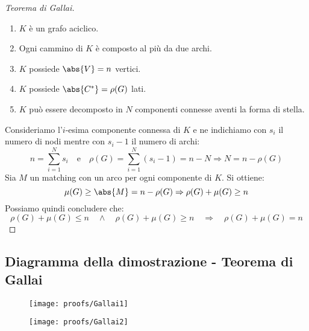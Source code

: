\documentclass[\main/main.tex]{subfiles}
\begin{document}
\begin{proof}[Teorema di Gallai]
	\begin{enumerate}
		\item \(K\) è un grafo aciclico.
		\item Ogni cammino di \(K\) è composto al più da due archi.
		\item \(K\) possiede \(\abs{V} = n\) vertici.
		\item \(K\) possiede \(\abs{C^*} = \rho(G)\) lati.
		\item \(K\) può essere decomposto in \(N\) componenti connesse aventi la forma di stella.
	\end{enumerate}

	Consideriamo l'\(i\)-esima componente connessa di \(K\) e ne indichiamo con \(s_i\) il numero di nodi mentre con \(s_i-1\) il numero di archi:
	\[
		n = \sum_{i=1}^N s_i \quad \text{e} \quad \rho(G) = \sum_{i=1}^N (s_i -1) = n - N \Rightarrow N = n - \rho(G)
	\]
	Sia \(M\) un matching con un arco per ogni componente di \(K\). Si ottiene:
	\[
		\mu(G) \geq \abs{M} = n - \rho(G) \Rightarrow \rho(G) + \mu(G) \geq n
	\]
	Possiamo quindi concludere che:
	\[
		\rho(G) + \mu(G) \leq n \quad \land \quad \rho(G) + \mu(G) \geq n\quad \Rightarrow \quad\rho(G) + \mu(G) = n
	\]

\end{proof}
\clearpage
\subsection{Diagramma della dimostrazione - Teorema di Gallai}
\begin{figure}
	\texttt{[image: proofs/Gallai1]}
\end{figure}
\clearpage
\begin{figure}
	\texttt{[image: proofs/Gallai2]}
\end{figure}
\clearpage
\end{document}
